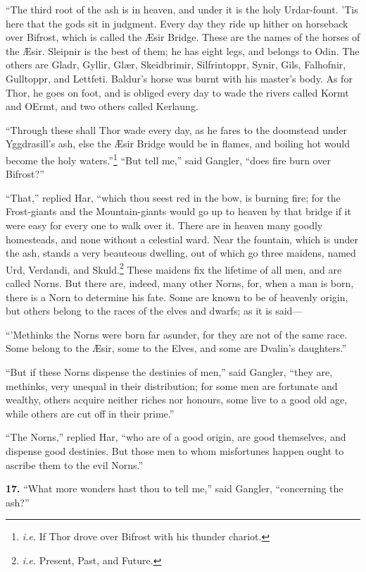 ``The third root of the ash is in heaven, and under it is the holy
Urdar-fount. 'Tis here that the gods sit in judgment. Every day they
ride up hither on horseback over Bifrost, which is called the Æsir
Bridge. These are the names of the horses of the Æsir. Sleipnir is the
best of them; he has eight legs, and belongs to Odin. The others are
Gladr, Gyllir, Glær, Skeidbrimir, Silfrintoppr, Synir, Gils,
Falhofnir, Gulltoppr, and Lettfeti. Baldur's horse was burnt with his
master's body. As for Thor, he goes on foot, and is obliged every day
to wade the rivers called Kormt and OErmt, and two others called
Kerlaung.

``Through these shall Thor wade every day, as he fares to the doomstead
under Yggdrasill's ash, else the Æsir Bridge would be in flames, and
boiling hot would become the holy waters.''\footnote{\emph{i.e.} If Thor drove over Bifrost with his thunder
chariot.} ``But tell me,'' said
Gangler, ``does fire burn over Bifrost?''

``That,'' replied Har, ``which thou seest red in the bow, is burning
fire; for the Frost-giants and the Mountain-giants would go up to
heaven by that bridge if it were easy for every one to walk over it.
There are in heaven many goodly homesteads, and none without a
celestial ward. Near the fountain, which is under the ash, stands a
very beauteous dwelling, out of which go three maidens, named Urd,
Verdandi, and Skuld.\footnote{\emph{i.e.} Present, Past, and Future.} These maidens fix the lifetime of all men,
and are called Norns. But there are, indeed, many other Norns, for,
when a man is born, there is a Norn to determine his fate. Some are
known to be of heavenly origin, but others belong to the races of the
elves and dwarfs; as it is said—

``'Methinks the Norns were born far asunder, for they are not of the
same race. Some belong to the Æsir, some to the Elves, and some are
Dvalin's daughters.''

``But if these Norns dispense the destinies of men,'' said Gangler,
``they are, methinks, very unequal in their distribution; for some men
are fortunate and wealthy, others acquire neither riches nor honours,
some live to a good old age, while others are cut off in their prime.''

``The Norns,'' replied Har, ``who are of a good origin, are good
themselves, and dispense good destinies. But those men to whom
misfortunes happen ought to ascribe them to the evil Norns.''

\textbf{17.} ``What more wonders hast thou to tell me,'' said Gangler,
``concerning the ash?''

